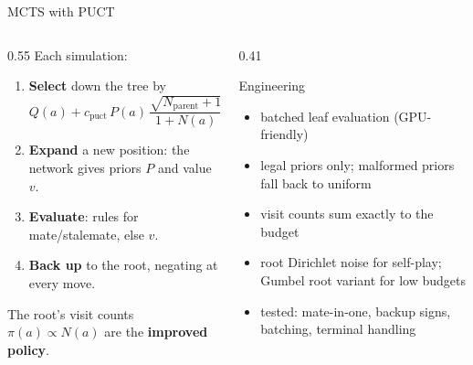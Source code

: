 \documentclass[aspectratio=169, 10pt]{beamer}
\begin{document}
\begin{frame}{MCTS with PUCT}
  \begin{columns}[T]
    \begin{column}{0.55\textwidth}
      Each simulation:
      \begin{enumerate}
        \item \textbf{Select} down the tree by
          \[
            Q(a) + c_{\text{puct}}\, P(a)\, \frac{\sqrt{N_{\text{parent}}+1}}{1 + N(a)}
          \]
        \item \textbf{Expand} a new position: the network gives priors $P$ and value $v$.
        \item \textbf{Evaluate}: rules for mate/stalemate, else $v$.
        \item \textbf{Back up} to the root, \alert{negating at every move}.
      \end{enumerate}
      The root's visit counts $\pi(a) \propto N(a)$ are the \textbf{improved policy}.
    \end{column}
    \begin{column}{0.41\textwidth}
      \begin{block}{Engineering}
        \small
        \begin{itemize}
          \item batched leaf evaluation (GPU-friendly)
          \item legal priors only; malformed priors fall back to uniform
          \item visit counts sum exactly to the budget
          \item root Dirichlet noise for self-play; Gumbel root variant for low budgets
          \item tested: mate-in-one, backup signs, batching, terminal handling
        \end{itemize}
      \end{block}
    \end{column}
  \end{columns}
\end{frame}
\end{document}
